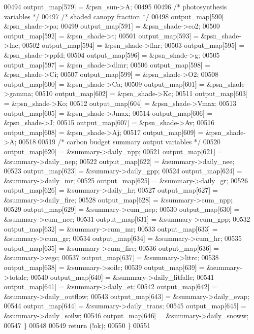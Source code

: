 \begin{DoxyCode}
00494         output\_map[579] = &psn\_sun->A;
00495         
00496         \textcolor{comment}{/* photosynthesis variables */}
00497         \textcolor{comment}{/* shaded canopy fraction */}
00498         output\_map[590] = &psn\_shade->pa;
00499         output\_map[591] = &psn\_shade->co2;
00500         output\_map[592] = &psn\_shade->t;
00501         output\_map[593] = &psn\_shade->lnc;
00502         output\_map[594] = &psn\_shade->flnr;
00503         output\_map[595] = &psn\_shade->ppfd;
00504         output\_map[596] = &psn\_shade->g;
00505         output\_map[597] = &psn\_shade->dlmr;
00506         output\_map[598] = &psn\_shade->Ci;
00507         output\_map[599] = &psn\_shade->O2;
00508         output\_map[600] = &psn\_shade->Ca;
00509         output\_map[601] = &psn\_shade->gamma;
00510         output\_map[602] = &psn\_shade->Kc;
00511         output\_map[603] = &psn\_shade->Ko;
00512         output\_map[604] = &psn\_shade->Vmax;
00513         output\_map[605] = &psn\_shade->Jmax;
00514         output\_map[606] = &psn\_shade->J;
00515         output\_map[607] = &psn\_shade->Av;
00516         output\_map[608] = &psn\_shade->Aj;
00517         output\_map[609] = &psn\_shade->A;
00518         
00519         \textcolor{comment}{/* carbon budget summary output variables */}
00520         output\_map[620] = &summary->daily\_npp;
00521         output\_map[621] = &summary->daily\_nep;
00522         output\_map[622] = &summary->daily\_nee;
00523         output\_map[623] = &summary->daily\_gpp;
00524         output\_map[624] = &summary->daily\_mr;
00525         output\_map[625] = &summary->daily\_gr;
00526         output\_map[626] = &summary->daily\_hr;
00527         output\_map[627] = &summary->daily\_fire;
00528         output\_map[628] = &summary->cum\_npp;
00529         output\_map[629] = &summary->cum\_nep;
00530         output\_map[630] = &summary->cum\_nee;
00531         output\_map[631] = &summary->cum\_gpp;
00532         output\_map[632] = &summary->cum\_mr;
00533         output\_map[633] = &summary->cum\_gr;
00534         output\_map[634] = &summary->cum\_hr;
00535         output\_map[635] = &summary->cum\_fire;
00536         output\_map[636] = &summary->vegc;
00537         output\_map[637] = &summary->litrc;
00538         output\_map[638] = &summary->soilc;
00539         output\_map[639] = &summary->totalc;
00540         output\_map[640] = &summary->daily\_litfallc;
00541         output\_map[641] = &summary->daily\_et;
00542         output\_map[642] = &summary->daily\_outflow;
00543         output\_map[643] = &summary->daily\_evap;
00544         output\_map[644] = &summary->daily\_trans;
00545         output\_map[645] = &summary->daily\_soilw;
00546         output\_map[646] = &summary->daily\_snoww;
00547     \}
00548     
00549     \textcolor{keywordflow}{return} (!ok);
00550 \}
00551         
\end{DoxyCode}
